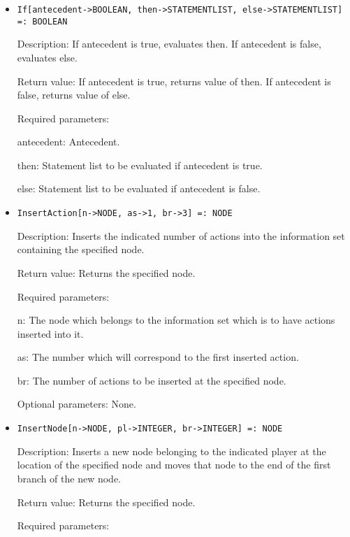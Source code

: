 \begin{itemize}
\item 
\protect \large \begin{verbatim}
If[antecedent->BOOLEAN, then->STATEMENTLIST, else->STATEMENTLIST] =: BOOLEAN
\end{verbatim} \normalsize
  
\bd
\item
[Description:] If antecedent is true, evaluates then.  If
antecedent is false, evaluates else. 
\item
[Return value:] If antecedent is true, returns value of then.  If
antecedent is false, returns value of else.  
\item
[Required parameters:]\hfil\null
\bd
\item
[antecedent:] Antecedent.  
\item
[then:] Statement list to be evaluated if antecedent is true. 
\ed
\item
[else:] Statement list to be evaluated if antecedent is false. 
\ed



\item
\protect \large \begin{verbatim}
InsertAction[n->NODE, as->1, br->3] =: NODE
\end{verbatim}\normalsize

\bd
\item
[Description:] Inserts the indicated number of actions into the
information set containing the specified node.
\item
[Return value:] Returns the specified node.
\item
[Required parameters:]\hfil\null

\bd
\item
[n:] The node which belongs to the information set which is to have
actions inserted into it.
\item
[as:] The number which will correspond to the first inserted action.
\item
[br:] The number of actions to be inserted at the specified node.
\ed

\item
[Optional parameters:] None.
\ed

\item
\protect \large \begin{verbatim}
InsertNode[n->NODE, pl->INTEGER, br->INTEGER] =: NODE
\end{verbatim}\normalsize

\bd
\item
[Description:] Inserts a new node belonging to the indicated player at
the location of the specified node and moves that node to the end of
the first branch of the new node.
\item
[Return value:] Returns the specified node.
\item
[Required parameters:]\hfil\null


\end{itemize}
